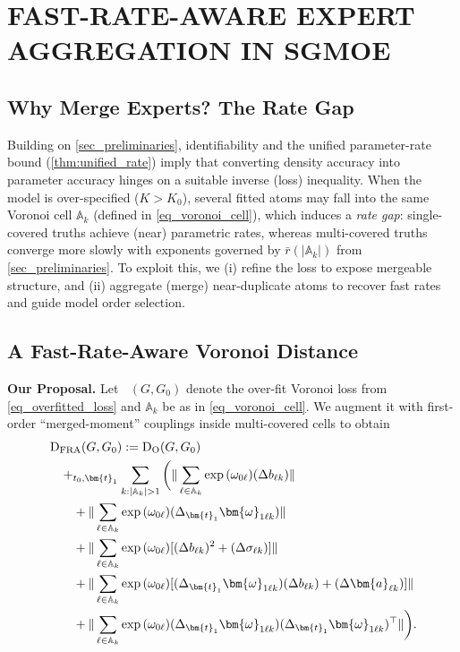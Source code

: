 \documentclass[twoside]{article}
\DeclareMathOperator*{\VDFRA}{D_{FRA}}
\DeclareMathOperator*{\VDO}{D_{O}}
\let\inf\relax
\DeclareMathOperator*\inf{\vphantom{p}inf}
\theoremstyle{plain}
\theoremstyle{definition}
\theoremstyle{plain}
\def\vomega{{\bm{\omega}}}
\def\va{{\bm{a}}}
\def\vt{{\bm{t}}}
\def\sA{{\mathbb{A}}}
\newcommand{\norm}[1]{\|#1\|}
\begin{document}
\section{FAST-RATE-AWARE EXPERT AGGREGATION IN SGMOE}
\label{sec_rate_aware_sgmoe}

\subsection{Why Merge Experts? The Rate Gap}
\label{subsec_motivation_rate_gap}
Building on \cref{sec_preliminaries}, identifiability and the unified parameter-rate bound (\cref{thm:unified_rate}) imply that converting density accuracy into parameter accuracy hinges on a suitable inverse (loss) inequality. When the model is over-specified ($K>K_0$), several fitted atoms may fall into the same Voronoi cell $\sA_k$ (defined in \cref{eq_voronoi_cell}), which induces a \emph{rate gap}: single-covered truths achieve (near) parametric rates, whereas multi-covered truths converge more slowly with exponents governed by $\bar r(|\sA_k|)$ from \cref{sec_preliminaries}. To exploit this, we (i) refine the loss to expose mergeable structure, and (ii) aggregate (merge) near-duplicate atoms to recover fast rates and guide model order selection.

\subsection{A Fast-Rate-Aware Voronoi Distance}
\label{subsec_rate_aware_loss}

{\bf Our Proposal.}
Let $\VDO(G,G_0)$ denote the over-fit Voronoi loss from \cref{eq_overfitted_loss} and $\sA_k$ be as in \cref{eq_voronoi_cell}. We augment it with first-order “merged-moment” couplings inside multi-covered cells to obtain
\begin{align}
    &\VDFRA (G, G_0) :=  \VDO (G, G_0) \nonumber\\
    & \quad+\inf_{t_{0}, \vt_{1}} \sum_{k: |\sA_{k}| > 1} \bigg( \norm{\sum_{\ell \in \sA_k} \exp{(\omega_{0\ell})} (\Delta b_{\ell k})} \nonumber \\
    &\qquad+ \norm{\sum_{\ell \in \sA_k} \exp{(\omega_{0\ell})} (\Delta_{\vt_1} \vomega_{1\ell k})} \nonumber \\
    &\qquad+ \norm{\sum_{\ell \in \sA_k} \exp{(\omega_{0\ell})}[(\Delta b_{\ell k})^2 + (\Delta \sigma_{\ell k})]} \nonumber \\
    &\qquad+ \norm{\sum_{\ell \in \sA_k} \exp{(\omega_{0\ell})}[(\Delta_{\vt_1} \vomega_{1\ell k})(\Delta b_{\ell k}) + (\Delta \va_{\ell k})]} \nonumber\\
    &\qquad+  \norm{\sum_{\ell \in \sA_k} \exp{(\omega_{0\ell})}(\Delta_{\vt_1} \vomega_{1\ell k})(\Delta_{\vt_1} \vomega_{1\ell k})^{\top}} \bigg).\label{eq_def_new_voronoi_D}
\end{align}
\end{document}
